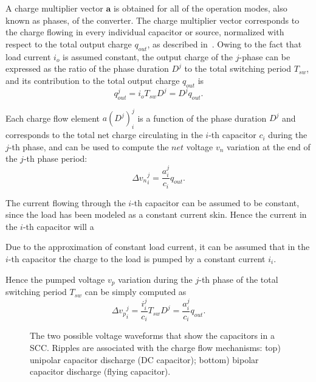 A charge multiplier vector $\mathbf{a}$ is obtained for all of the operation modes, also known as phases, of the converter. The charge multiplier vector corresponds to the charge flowing in every individual capacitor or source, normalized with respect to the total output charge $q_{out}$, as described in~\cite{95Makowski,Seeman:EECS-2009-78}. Owing to the fact that load current $i_o$ is assumed constant, the output charge of the $j$-phase can be expressed as the ratio of the phase duration $D^j$ to the total switching period $T_{sw}$, and its contribution to the total output charge $q_{out}$ is
\begin{equation}
    q^j_{out} = i_{o} T_{sw} D^j = D^j q_{out} .
\label{eq:qout}
\end{equation}

Each charge flow element $ a(D^j)_i^j$  is a function of the phase duration $D^j$ and corresponds to the total net charge circulating in the $i$-th capacitor $c_i$ during the $j$-th phase, and can be used to compute the $net$ voltage $v_n$ variation at the end of the $j$-th phase period:
\begin{equation}
\Delta {v_n}^j_i  = \frac{a_i ^j }{c_i} q_{out} .
\label{eq:net_voltage}
\end{equation}

The current flowing through the $i$-th capacitor can be assumed to be constant, since the load has been modeled as a constant current skin. Hence the current in the $i$-th capacitor will a

 Due to the approximation of constant load current, it can be assumed that in the $i$-th capacitor the charge to the load is pumped by a constant current $i_i$.


Hence the pumped voltage $v_p$ variation during the $j$-th phase of the total switching period $T_{sw}$ can be simply computed as
\begin{equation}
\Delta {v_p}^j_i  = \frac{i_i^j}{c_i} T_{sw} D^j = \frac{a_i ^j }{c_i} q_{out} .
\label{eq:pumped_voltage}
\end{equation}


\begin{figure}[!h]
\centering

\caption{The two possible voltage waveforms that show the capacitors in a SCC. Ripples are associated with the charge flow mechanisms: top) unipolar capacitor discharge (DC capacitor); bottom) bipolar capacitor discharge (flying capacitor).}
\label{fig:charge_flow_I}
\end{figure}


